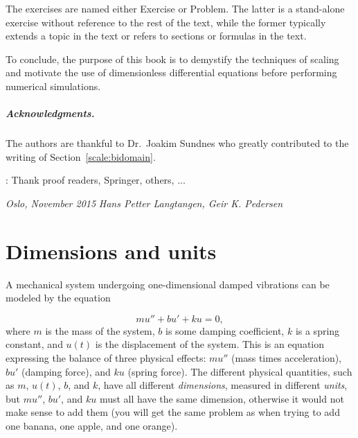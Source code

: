 \documentclass[graybox,envcountchap,sectrefs,final]{svmonodo}
\newcommand{\shortinlinecomment}[3]{{\color{red}{\bf #1}: #2}}
\begin{document}
The exercises are named either Exercise or Problem. The latter is
a stand-alone exercise without reference to the rest of the text, while
the former typically extends a topic in the text or refers to sections or
formulas in the text.

To conclude, the purpose of this book is to demystify the
techniques of scaling and motivate the use of dimensionless
differential equations before performing numerical simulations.

\paragraph{Acknowledgments.}
The authors are thankful to Dr.~Joakim Sundnes who greatly contributed to
the writing of Section~\ref{scale:bidomain}.

\shortinlinecomment{hpl 1}{ Thank proof readers, Springer, others, ... }{ Thank proof readers, Springer, }


\vspace{1cm}

\noindent
{\it Oslo, November 2015}  \hfill  {\it Hans Petter Langtangen, Geir K. Pedersen}



\tableofcontents


\vspace{1cm} %

\mainmatter





\chapter{Dimensions and units}
\label{scale:dimunit}


A mechanical system undergoing one-dimensional damped vibrations can be
modeled by the equation

\begin{equation}
mu'' + bu' + ku = 0,
\label{scale:dimunit:eq:u}
\end{equation}
where $m$ is the mass of the system, $b$ is some damping coefficient,
$k$ is a spring constant, and $u(t)$ is the displacement of the system.
This is an equation expressing
the balance of three physical effects: $mu''$ (mass times
acceleration), $bu'$ (damping force), and $ku$ (spring force).
The different physical quantities, such as $m$, $u(t)$, $b$, and $k$,
have all different \emph{dimensions}, measured in different \emph{units},
but $mu''$, $bu'$, and $ku$ must all have the same dimension, otherwise
it would not make sense to add them (you will get the same problem
as when trying to add one banana, one apple, and one orange).
\end{document}
